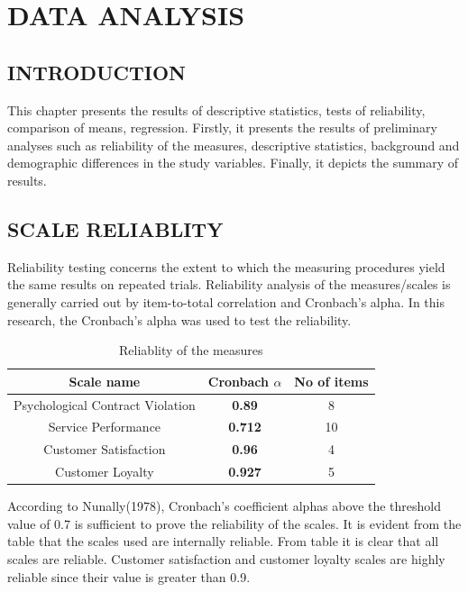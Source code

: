 \documentclass[a4paper, 12pt]{extarticle}
\begin{document}
{\section{DATA ANALYSIS}
\subsection{INTRODUCTION}
This chapter presents the results of descriptive statistics, tests of reliability, comparison of means, regression. Firstly, it presents the results of preliminary analyses such as reliability of the measures, descriptive statistics, background and demographic differences in the study variables. Finally, it depicts the summary of results.

\subsection{SCALE RELIABLITY}
Reliability testing concerns the extent to which the measuring procedures yield the same results on repeated trials. Reliability analysis of the measures/scales is generally carried out by item-to-total correlation and Cronbach's alpha. In this research, the Cronbach's  alpha was used to test the reliability.
\begin{table}[H]
\centering
\begin{tabular}{|c|c|c|}
\hline
\textbf{Scale name} & \textbf{Cronbach $\alpha$} & \textbf{No of items}\\
\hline
Psychological Contract Violation & \textbf{0.89} & 8\\
\hline
Service Performance & \textbf{0.712} & 10\\
\hline
Customer Satisfaction & \textbf{0.96} & 4\\
\hline
Customer Loyalty & \textbf{0.927} & 5 \\
\hline
\end{tabular}
\caption{Reliablity of the measures}
\end{table}

\par According to Nunally(1978), Cronbach's coefficient alphas above the threshold value of 0.7 is sufficient to prove the reliability of the scales. It is evident from the table that the scales used are internally reliable. From table it is clear that all scales are reliable. Customer satisfaction and customer loyalty scales are highly reliable since their value is greater than 0.9.

}
\end{document}
